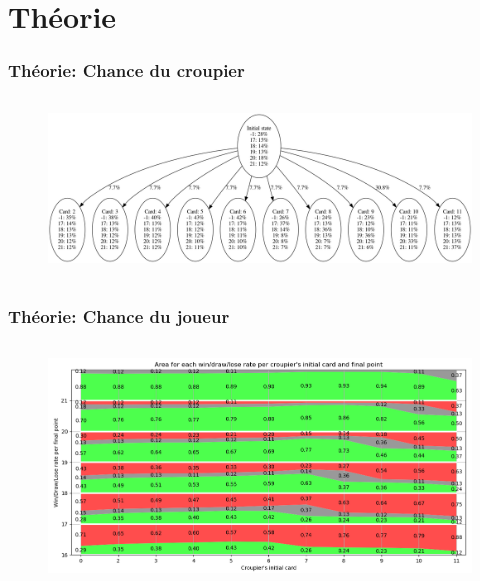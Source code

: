\documentclass{beamer}
\begin{document}
\section{Théorie}

\begin{frame}
    \frametitle{Théorie: Chance du croupier}
    \begin{columns}
        \column{\dimexpr\paperwidth-1pt}
        \begin{figure}[H]
            \begin{center}
                \includegraphics[width=1\textwidth]{theoretical_croupier_h}
            \end{center}
        \end{figure}
    \end{columns}
\end{frame}

\begin{frame}
    \frametitle{Théorie: Chance du joueur}
    \begin{columns}
        \column{\dimexpr\paperwidth-1pt}
        \begin{figure}[H]
            \begin{center}
                \includegraphics[width=1\textwidth]{theoretical_graph1}
            \end{center}
        \end{figure}
    \end{columns}
\end{frame}
\end{document}
